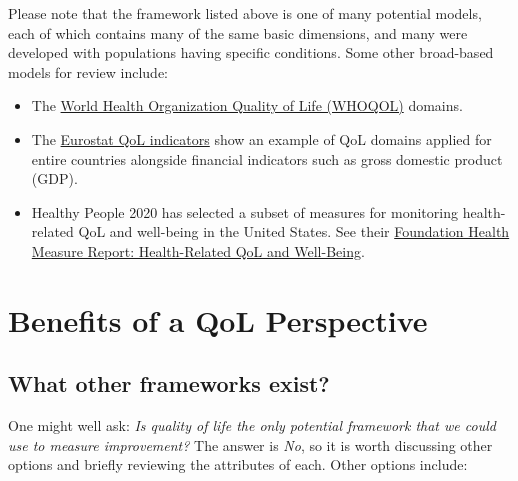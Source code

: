 \documentclass[
]{book}
\providecommand{\tightlist}{%
  \setlength{\itemsep}{0pt}\setlength{\parskip}{0pt}}
\begin{document}
Please note that the framework listed above is one of many potential models, each of which contains many of the same basic dimensions, and many were developed with populations having specific conditions. Some other broad-based models for review include:

\begin{itemize}
\tightlist
\item
  The \href{https://apps.who.int/iris/bitstream/handle/10665/77932/WHO_HIS_HSI_Rev.2012.03_eng.pdf?sequence=1\&isAllowed=y}{World Health Organization Quality of Life (WHOQOL)} domains.
\item
  The \href{https://ec.europa.eu/eurostat/statistics-explained/index.php?title=Quality_of_life_indicators}{Eurostat QoL indicators} show an example of QoL domains applied for entire countries alongside financial indicators such as gross domestic product (GDP).
\item
  Healthy People 2020 has selected a subset of measures for monitoring health-related QoL and well-being in the United States. See their \href{https://www.healthypeople.gov/sites/default/files/HRQoLWBFullReport.pdf}{Foundation Health Measure Report: Health-Related QoL and Well-Being}.
\end{itemize}

\hypertarget{benefits-of-a-qol-perspective}{%
\section{Benefits of a QoL Perspective}\label{benefits-of-a-qol-perspective}}

\hypertarget{what-other-frameworks-exist}{%
\subsection{What other frameworks exist?}\label{what-other-frameworks-exist}}

One might well ask: \emph{Is quality of life the only potential framework that we could use to measure improvement?} The answer is \emph{No}, so it is worth discussing other options and briefly reviewing the attributes of each. Other options include:
\end{document}
